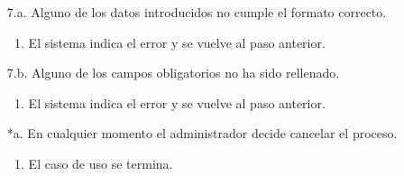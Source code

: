 \documentclass{book}
\begin{document}
\begin{itemize}
\begin{itemize}
	\item[7.a.] Alguno de los datos introducidos no cumple el formato correcto.
		\begin{enumerate}
		\item El sistema indica el error y se vuelve al paso anterior.
		\end{enumerate}
	\item[7.b.] Alguno de los campos obligatorios no ha sido rellenado.
		\begin{enumerate}
		\item El sistema indica el error y se vuelve al paso anterior.
		\end{enumerate}	
	\item[*a.] En cualquier momento el administrador decide cancelar el proceso.
		\begin{enumerate}
		\item El caso de uso se termina.
		\end{enumerate}
	\end{itemize}
\end{itemize}

\end{document}
